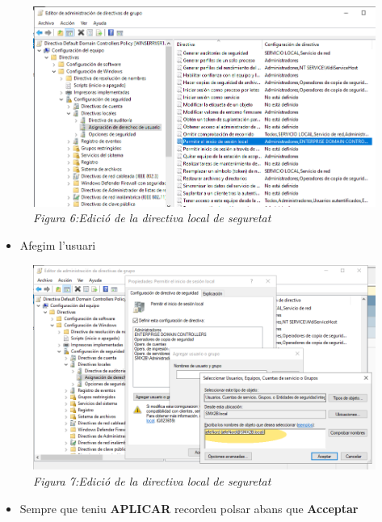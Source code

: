\documentclass[
  a4paper,
]{article}
\providecommand{\tightlist}{%
  \setlength{\itemsep}{0pt}\setlength{\parskip}{0pt}}
\begin{document}
\begin{figure}
\centering
\includegraphics{png/EditarDirectiva2.png}
\caption{\emph{Figura 6:Edició de la directiva local de seguretat}}
\end{figure}

\begin{itemize}
\tightlist
\item
  Afegim l'usuari
\end{itemize}

\begin{figure}
\centering
\includegraphics{png/EditarDirectiva3.png}
\caption{\emph{Figura 7:Edició de la directiva local de seguretat}}
\end{figure}

\begin{itemize}
\tightlist
\item
  Sempre que teniu \textbf{APLICAR} recordeu polsar abans que
  \textbf{Acceptar}
\end{itemize}
\end{document}

